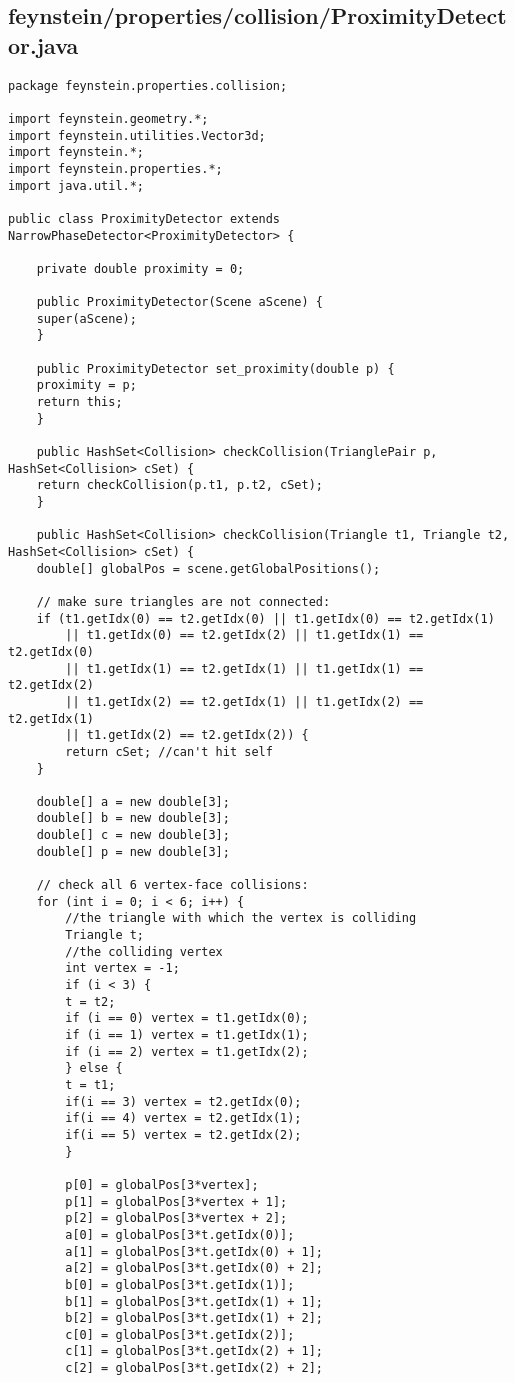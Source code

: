 \subsection*{feynstein/properties/collision/ProximityDetector.java}
\begin{lstlisting}
package feynstein.properties.collision;

import feynstein.geometry.*;
import feynstein.utilities.Vector3d;
import feynstein.*;
import feynstein.properties.*;
import java.util.*;

public class ProximityDetector extends NarrowPhaseDetector<ProximityDetector> {

    private double proximity = 0;   

    public ProximityDetector(Scene aScene) {
	super(aScene);
    }

    public ProximityDetector set_proximity(double p) {
	proximity = p;
	return this;
    }
    
    public HashSet<Collision> checkCollision(TrianglePair p, HashSet<Collision> cSet) {
	return checkCollision(p.t1, p.t2, cSet);
    }

    public HashSet<Collision> checkCollision(Triangle t1, Triangle t2, HashSet<Collision> cSet) {
	double[] globalPos = scene.getGlobalPositions();

	// make sure triangles are not connected:
	if (t1.getIdx(0) == t2.getIdx(0) || t1.getIdx(0) == t2.getIdx(1) 
	    || t1.getIdx(0) == t2.getIdx(2) || t1.getIdx(1) == t2.getIdx(0) 
	    || t1.getIdx(1) == t2.getIdx(1) || t1.getIdx(1) == t2.getIdx(2) 
	    || t1.getIdx(2) == t2.getIdx(1) || t1.getIdx(2) == t2.getIdx(1) 
	    || t1.getIdx(2) == t2.getIdx(2)) {
	    return cSet; //can't hit self
	}
	
	double[] a = new double[3];
	double[] b = new double[3];
	double[] c = new double[3];
	double[] p = new double[3];

	// check all 6 vertex-face collisions:
	for (int i = 0; i < 6; i++) {
	    //the triangle with which the vertex is colliding
	    Triangle t;
	    //the colliding vertex
	    int vertex = -1;
	    if (i < 3) {
		t = t2;
		if (i == 0) vertex = t1.getIdx(0);
		if (i == 1) vertex = t1.getIdx(1);
		if (i == 2) vertex = t1.getIdx(2);
	    } else {
		t = t1;
		if(i == 3) vertex = t2.getIdx(0);
		if(i == 4) vertex = t2.getIdx(1);
		if(i == 5) vertex = t2.getIdx(2);
	    }

	    p[0] = globalPos[3*vertex];
	    p[1] = globalPos[3*vertex + 1];
	    p[2] = globalPos[3*vertex + 2];
	    a[0] = globalPos[3*t.getIdx(0)];	
	    a[1] = globalPos[3*t.getIdx(0) + 1];
	    a[2] = globalPos[3*t.getIdx(0) + 2];
	    b[0] = globalPos[3*t.getIdx(1)];
	    b[1] = globalPos[3*t.getIdx(1) + 1];
	    b[2] = globalPos[3*t.getIdx(1) + 2];
	    c[0] = globalPos[3*t.getIdx(2)];
	    c[1] = globalPos[3*t.getIdx(2) + 1];
	    c[2] = globalPos[3*t.getIdx(2) + 2];


\end{lstlisting}
